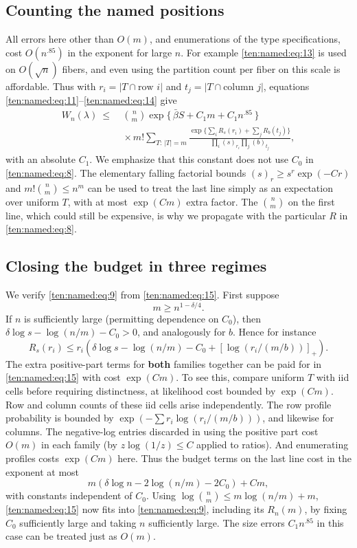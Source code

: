 \subsection{Counting the named positions}
All errors here other than \(O(m)\), and enumerations of the type specifications, cost \(O(n^{.85})\) in the exponent for large \(n\). For example \eqref{ten:named:eq:13} is used on \(O(\sqrt n)\) fibers, and even using the partition count per fiber on this scale is affordable. Thus with \(r_i=|T\cap\text{row }i|\) and \(t_j=|T\cap\text{column }j|\), equations \eqref{ten:named:eq:11}--\eqref{ten:named:eq:14} give
\begin{equation}
\begin{split}
 W_n(\lambda)\ \le\
 & \binom{n}{m}
 \exp\{\,\bar\beta S+C_1 m+C_1 n^{.85}\,\}\\
 &{}\times m!\sum_{T:\, |T|=m}
 \frac{\exp\{ \sum_i R_s(r_i)+\sum_j R_b(t_j)\}}
      {\prod_i(s)_{r_i}\prod_j(b)_{t_j}},
\end{split}
 \label{ten:named:eq:15}
\end{equation}
with an absolute \(C_1\). We emphasize that this constant does not use \(C_0\) in \eqref{ten:named:eq:8}. The elementary falling factorial bounds
\((s)_r\ge s^r\exp(-C r)\) and
\(m!\binom{n}{m}\le n^m\)
can be used to treat the last line simply as an expectation over uniform \(T\), with at most \(\exp(Cm)\) extra factor. The \(\binom{n}{m}\) on the first line, which could still be expensive, is why we propagate with the particular \(R\) in \eqref{ten:named:eq:8}.

\subsection{Closing the budget in three regimes}
We verify \eqref{ten:named:eq:9} from \eqref{ten:named:eq:15}. First suppose
\[
 m\ge n^{1-\delta/4}.
\]
If \(n\) is sufficiently large (permitting dependence on \(C_0\)), then \(\delta\log s-\log(n/m)-C_0>0\), and analogously for \(b\). Hence for instance
\[
 R_s(r_i)\le
 r_i\left(\delta\log s-\log(n/m)-C_0+
                 [\log(r_i/(m/b))]_+\right).
\]
The extra positive-part terms for \textbf{both} families together can be paid for in \eqref{ten:named:eq:15} with cost \(\exp(Cm)\). To see this, compare uniform \(T\) with iid cells before requiring distinctness, at likelihood cost bounded by \(\exp(Cm)\). Row and column counts of these iid cells arise independently. The row profile probability is bounded by
\(\exp(-\sum r_i\log(r_i/(m/b)))\), and likewise for columns. The negative-log entries discarded in using the positive part cost \(O(m)\) in each family (by \(z\log(1/z)\le C\) applied to ratios). And enumerating profiles costs \(\exp(Cm)\) here. Thus the budget terms on the last line cost in the exponent at most
\[
 m(\delta\log n-2\log(n/m)-2C_0)+C m,
\]
with constants independent of \(C_0\). Using \(\log\binom{n}{m}\le m\log(n/m)+m\), \eqref{ten:named:eq:15} now fits into \eqref{ten:named:eq:9}, including its \(R_n(m)\), by fixing \(C_0\) sufficiently large and taking \(n\) sufficiently large. The size errors \(C_1 n^{.85}\) in this case can be treated just as \(O(m)\).

